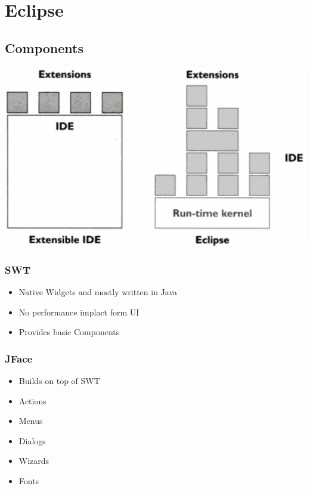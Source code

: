 \section{Eclipse}
\subsection{Components}
\includegraphics[width=0.7\linewidth]{./img/eclipse_components.png}
\subsubsection{SWT}
\begin{itemize}
    \item Native Widgets and mostly written in Java
    \item No performance implact form UI
    \item Provides basic Components
\end{itemize}
\subsubsection{JFace}
\begin{itemize}
    \item Builds on top of SWT 
    \item Actions 
    \item Menus 
    \item Dialogs 
    \item Wizards 
    \item Fonts 
\end{itemize}
